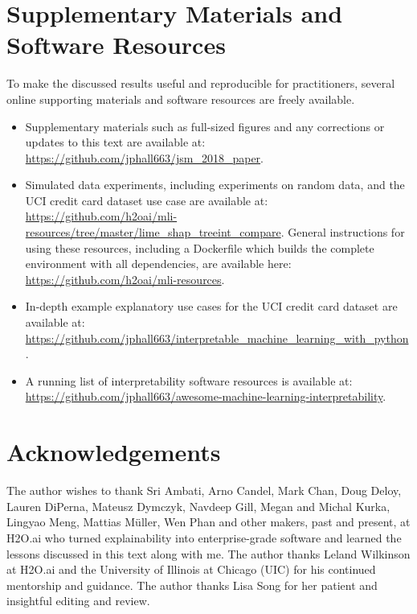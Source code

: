 \documentclass[11pt]{asaproc}
\begin{document}
\section{Supplementary Materials and Software Resources } \label{sec:software}

To make the discussed results useful and reproducible for practitioners, several online supporting materials and software resources are freely available. 

\begin{itemize}

	\item Supplementary materials such as full-sized figures and any corrections or updates to this text are available  at: \url{https://github.com/jphall663/jsm_2018_paper}.

	\item Simulated data experiments, including experiments on random data, and the UCI credit card dataset use case are available at: \url{https://github.com/h2oai/mli-resources/tree/master/lime_shap_treeint_compare}. General instructions for using these resources, including a Dockerfile which builds the complete environment with all dependencies, are available here: \url{https://github.com/h2oai/mli-resources}.

	\item In-depth example explanatory use cases for the UCI credit card dataset are available at: \url{https://github.com/jphall663/interpretable_machine_learning_with_python}.

	\item A running list of interpretability software resources is available at: \url{https://github.com/jphall663/awesome-machine-learning-interpretability}.

\end{itemize}

\section{Acknowledgements} 

The author wishes to thank Sri Ambati, Arno Candel, Mark Chan,  Doug Deloy, Lauren DiPerna, Mateusz Dymczyk, Navdeep Gill, Megan and Michal Kurka, Lingyao Meng, Mattias M\"uller, Wen Phan and other makers, past and present, at H2O.ai who turned explainability into enterprise-grade software and learned the lessons discussed in this text along with me. The author thanks Leland Wilkinson at H2O.ai and the University of Illinois at Chicago (UIC) for his continued mentorship and guidance. The author thanks Lisa Song for her patient and insightful editing and review. 




\end{document}
